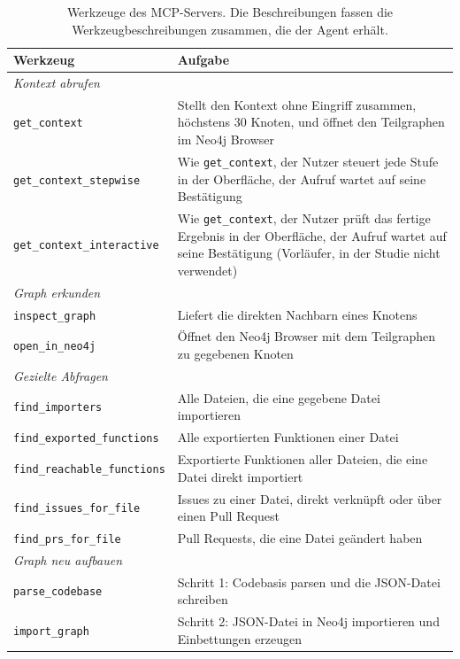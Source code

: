 \begin{table}[htbp]
  \centering
  \caption{Werkzeuge des MCP-Servers. Die Beschreibungen fassen die Werkzeugbeschreibungen zusammen, die der Agent erhält.}
  \label{tab:mcp-werkzeuge}
  \small
  \begin{tabularx}{\textwidth}{l>{\raggedright\arraybackslash}X}
    \toprule
    Werkzeug & Aufgabe \\
    \midrule
    \multicolumn{2}{l}{\emph{Kontext abrufen}} \\
    \texttt{get\_context} & Stellt den Kontext ohne Eingriff zusammen, höchstens 30 Knoten, und öffnet den Teilgraphen im Neo4j Browser \\
    \texttt{get\_context\_stepwise} & Wie \texttt{get\_context}, der Nutzer steuert jede Stufe in der Oberfläche, der Aufruf wartet auf seine Bestätigung \\
    \texttt{get\_context\_interactive} & Wie \texttt{get\_context}, der Nutzer prüft das fertige Ergebnis in der Oberfläche, der Aufruf wartet auf seine Bestätigung (Vorläufer, in der Studie nicht verwendet) \\
    \midrule
    \multicolumn{2}{l}{\emph{Graph erkunden}} \\
    \texttt{inspect\_graph} & Liefert die direkten Nachbarn eines Knotens \\
    \texttt{open\_in\_neo4j} & Öffnet den Neo4j Browser mit dem Teilgraphen zu gegebenen Knoten \\
    \midrule
    \multicolumn{2}{l}{\emph{Gezielte Abfragen}} \\
    \texttt{find\_importers} & Alle Dateien, die eine gegebene Datei importieren \\
    \texttt{find\_exported\_functions} & Alle exportierten Funktionen einer Datei \\
    \texttt{find\_reachable\_functions} & Exportierte Funktionen aller Dateien, die eine Datei direkt importiert \\
    \texttt{find\_issues\_for\_file} & Issues zu einer Datei, direkt verknüpft oder über einen Pull Request \\
    \texttt{find\_prs\_for\_file} & Pull Requests, die eine Datei geändert haben \\
    \midrule
    \multicolumn{2}{l}{\emph{Graph neu aufbauen}} \\
    \texttt{parse\_codebase} & Schritt 1: Codebasis parsen und die JSON-Datei schreiben \\
    \texttt{import\_graph} & Schritt 2: JSON-Datei in Neo4j importieren und Einbettungen erzeugen \\
    \bottomrule
  \end{tabularx}
\end{table}

